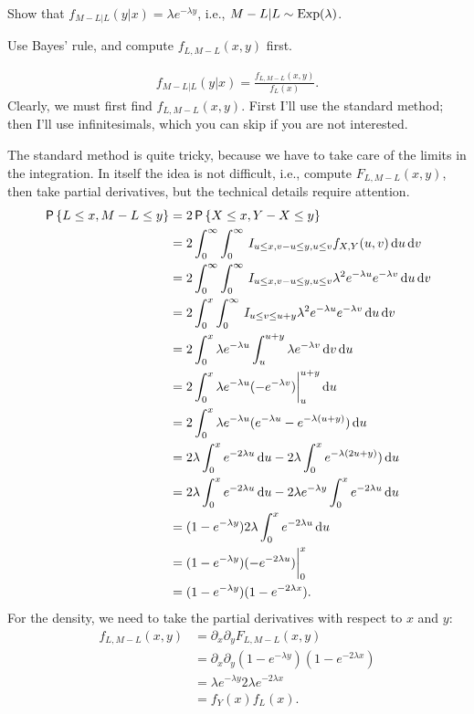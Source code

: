\documentclass[a4paper,12pt]{article}
\begin{document}
\begin{exercise}\label{ex:5}
Show that $f_{M-L|L}(y| x) = \lambda e^{-\lambda y}$, i.e., $M-L| L \sim \mathrm{Exp}(\lambda)$.
\begin{hint}
Use Bayes' rule, and compute $f_{L, M-L}(x,y)$  first.
\end{hint}
\begin{solution}
  \begin{align}
    \label{eq:29}
f_{M-L| L}(y| x) =  \frac{f_{L, M-L}(x, y)}{f_L(x)}.
  \end{align}
Clearly, we must first find $f_{L, M-L}(x, y)$. 
First I'll use the standard method; then I'll use infinitesimals, which you can skip if you are not interested.

The standard method is quite tricky, because we have to take care of the limits in the integration. In itself the idea is not difficult, i.e., compute $F_{L, M-L}(x, y)$, then take partial derivatives, but the technical details require attention.
\begin{align}  \label{eq:23}
\,\mathsf{P}\left\{L\leq x, M-L\leq y\right\} 
&= 2\,\mathsf{P}\left\{X\leq x, Y-X \leq y\right\} \\
&= 2\int_0^{\infty} \int_0^{\infty} \,I_{u\leq x, v-u\leq y, u \leq v} f_{X,Y}(u, v)  \,\textrm{d}u \,\textrm{d}v\\
&= 2\int_0^{\infty} \int_0^{\infty} \,I_{u\leq x, v-u\leq y, u\leq v} \lambda^2e^{-\lambda u}e^{-\lambda v}\,\textrm{d}u \,\textrm{d}v\\
&= 2\int_0^{x} \int_0^{\infty} \,I_{u\leq v\leq u+y} \lambda^2e^{-\lambda u}e^{-\lambda v}\,\textrm{d}u \,\textrm{d}v\\
&= 2\int_0^{x} \lambda e^{-\lambda u} \int_u   ^{u + y}  \lambda e^{-\lambda v}\,\textrm{d}v \,\textrm{d}u\\
&= 2\int_0^{x} \lambda e^{-\lambda u} (-e^{-\lambda v}) \biggr|_u^{u+y}\,\textrm{d}u \\
&= 2\int_0^{x} \lambda e^{-\lambda u} (e^{-\lambda u} - e^{-\lambda (u+y)})\,\textrm{d}u \\
&= 2\lambda\int_0^{x}  e^{-2 \lambda u}\,\textrm{d}u  - 2\lambda \int_{0}^{x} e^{-\lambda (2u+y)})\,\textrm{d}u \\
&= 2\lambda\int_0^{x}  e^{-2 \lambda u}\,\textrm{d}u  - 2\lambda e^{-\lambda y }\int_{0}^{x} e^{-2 \lambda u}\,\textrm{d}u \\
&= (1-e^{-\lambda y}) 2 \lambda \int_0^{x} e^{-2 \lambda u} \,\textrm{d}u\\ 
&= (1-e^{-\lambda y}) ( -e^{-2\lambda u}) \biggr|_0^{x} \\ 
&= (1-e^{-\lambda y})(1- e^{-2\lambda x}).
\end{align}
For the density, we need to take the partial derivatives with respect to $x$ and $y$: 
\begin{align}
  \label{eq:25}
f_{L, M-L}(x,y ) 
&= \partial_x\partial_{y} F_{L, M-L}(x,y)   \\
&= \partial_x\partial_{y} (1-e^{-\lambda y})(1- e^{-2\lambda x}) \\
&= \lambda e^{-\lambda y} 2\lambda  e^{-2\lambda x} \\
&= f_Y(x) f_L(x).
\end{align}



\end{solution}
\end{exercise}
\end{document}

